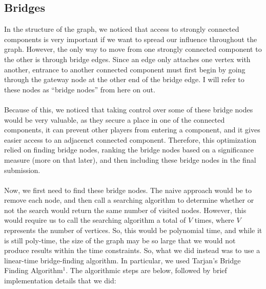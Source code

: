 \documentclass{article}
\begin{document}
\subsection*{Bridges}
  In the structure of the graph, we noticed that access to strongly connected components is 
  very important if we want to spread our influence throughout the graph. However, the only way to move from one strongly connected component to the other is through bridge edges. Since an edge only attaches one vertex with another, entrance to another connected component must first begin by going through the gateway node at the other end of the bridge edge. I will refer to these nodes as ``bridge nodes'' from here on out. 
  \\ \\
  Because of this, we noticed that taking control over some of these bridge nodes would be very valuable, as they secure a place in one of the connected components, it can prevent other players from entering a component, and it gives easier access to an adjacenct connected component. Therefore, this optimization relied on finding bridge nodes, ranking the bridge nodes based on a significance measure (more on that later), and then including these bridge nodes in the final submission.
  \\ \\
  Now, we first need to find these bridge nodes. The naive approach would be to remove each node, and then call a searching algorithm to determine whether or not the search would return the same number of visited nodes. However, this would require us to call the searching algorithm a total of $V$ times, where $V$ represents the number of vertices. So, this would be polynomial time, and while it is still poly-time, the size of the graph may be so large that we would not produce results within the time constraints. So, what we did instead was to use a linear-time bridge-finding algorithm. In particular, we used Tarjan's Bridge Finding Algorithm$^1$. The algorithmic steps are below, followed by brief implementation details that we did:
  
\end{document}
